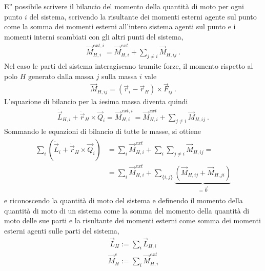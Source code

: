 \documentclass[letterpaper,10pt,italian]{jupyterBook}
\begin{document}
\sphinxAtStartPar
E” possibile scrivere il bilancio del momento della quantità di moto per ogni punto \(i\) del sistema, scrivendo la risultante dei momenti esterni agente sul punto come la somma dei momenti esterni all’intero sistema agenti sul punto e i momenti interni scambiati con gli altri punti del sistema,
\begin{equation*}
\begin{split}\vec{M}_{H,i}^{ext,i} = \vec{M}_{H,i}^{ext} + \sum_{j \ne i} \vec{M}_{H,ij} \ .\end{split}
\end{equation*}
\sphinxAtStartPar
Nel caso le parti del sistema interagiscano tramite forze, il momento rispetto al polo \(H\) generato dalla massa \(j\) sulla massa \(i\) vale
\begin{equation*}
\begin{split}\vec{M}_{H,ij} = (\vec{r}_i - \vec{r}_H) \times \vec{F}_{ij} \ .\end{split}
\end{equation*}
\sphinxAtStartPar
L’equazione di bilancio per la \(i\)\sphinxhyphen{}esima massa diventa quindi
\begin{equation*}
\begin{split}\dot{\vec{L}}_{H,i} + \dot{\vec{r}}_H \times \vec{Q}_i = \vec{M}_{H,i}^{ext,i} = \vec{M}_{H,i}^{ext} + \sum_{j \ne i} \vec{M}_{H,ij} \ .\end{split}
\end{equation*}
\sphinxAtStartPar
Sommando le equazioni di bilancio di tutte le masse, si ottiene
\begin{equation*}
\begin{split}\begin{aligned}
\sum_{i} \left( \dot{\vec{L}}_i + \dot{\vec{r}}_H \times \vec{Q}_i \right) & = \sum_i \vec{M}_{H,i}^{ext} + \sum_i \sum_{j \ne i} \vec{M}_{H,ij} = \\
                            & = \sum_i \vec{M}_{H,i}^{ext} + \sum_{\{i,j\}} \underbrace{\left( \vec{M}_{H,ij} + \vec{M}_{H,ji} \right)}_{=\vec{0}} 
\end{aligned}\end{split}
\end{equation*}
\sphinxAtStartPar
e riconoscendo la quantità di moto del sistema e definendo il momento della quantità di moto di un sistema come la somma del momento della quantità di moto delle sue parti e la risultante dei momenti esterni come somma dei momenti esterni agenti sulle parti del sistema,
\begin{equation*}
\begin{split}\vec{L}_H := \sum_i \vec{L}_{H,i}\end{split}
\end{equation*}\begin{equation*}
\begin{split}\vec{M}_H^e := \sum_i \vec{M}_{H,i}^{ext}\end{split}
\end{equation*}
\end{document}
